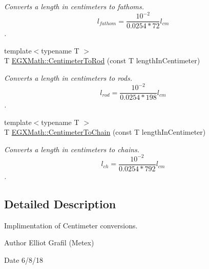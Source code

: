 \begin{DoxyCompactItemize}
\begin{DoxyCompactList}\small\item\em Converts a length in centimeters to fathoms. \[ l_{fathom}= \frac{10^{-2}}{0.0254 * 72} l_{cm} \]. \end{DoxyCompactList}\item 
{\footnotesize template$<$typename T $>$ }\\T \mbox{\hyperlink{group___e_g_x_math-_conversions-_length_conversions-_s_i-_centimeter-_surveyors_gae8148fd547fed6b4308b4ba4b54c2273}{E\+G\+X\+Math\+::\+Centimeter\+To\+Rod}} (const T length\+In\+Centimeter)
\begin{DoxyCompactList}\small\item\em Converts a length in centimeters to rods. \[ l_{rod}= \frac{10^{-2}}{0.0254 * 198} l_{cm} \]. \end{DoxyCompactList}\item 
{\footnotesize template$<$typename T $>$ }\\T \mbox{\hyperlink{group___e_g_x_math-_conversions-_length_conversions-_s_i-_centimeter-_surveyors_gaec0a2935a1378c75c03f93d48794374a}{E\+G\+X\+Math\+::\+Centimeter\+To\+Chain}} (const T length\+In\+Centimeter)
\begin{DoxyCompactList}\small\item\em Converts a length in centimeters to chains. \[ l_{ch}= \frac{10^{-2}}{0.0254 * 792} l_{cm} \]. \end{DoxyCompactList}\end{DoxyCompactItemize}


\subsection{Detailed Description}
Implimentation of Centimeter conversions. 

\begin{DoxyAuthor}{Author}
Elliot Grafil (Metex) 
\end{DoxyAuthor}
\begin{DoxyDate}{Date}
6/8/18 
\end{DoxyDate}
